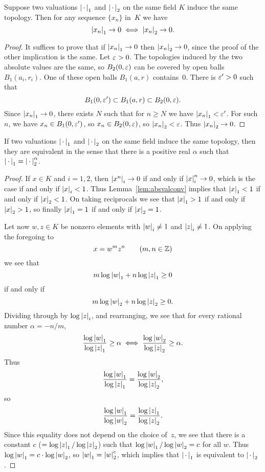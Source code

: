 \begin{lemma}\label{lem:absvalconv}
Suppose two valuations $\left|\,\cdot\,\right|_1$ and $\left|\,\cdot\,\right|_2$ on the same
field $K$ induce the same topology. Then
for any sequence $\{x_n\}$ in~$K$ we
have 
$$
  \left|x_n\right|_1 \to 0 \iff \left|x_n\right|_2 \to 0.
$$
\end{lemma}
\begin{proof}
It suffices to prove that if $\left|x_n\right|_1\to 0$
then $\left|x_n\right|_2\to 0$, since the proof of the
other implication is the same. 
Let $\varepsilon>0$.  The topologies induced by the two absolute
values are the same, so $B_2(0,\varepsilon)$ can be covered by
open balls $B_1(a_i,r_i)$.  One of these open balls
$B_1(a,r)$ contains~$0$. There is $\varepsilon'>0$ such that
$$
  B_1(0,\varepsilon') \subset B_1(a,r)\subset B_2(0,\varepsilon).
$$
Since $\left|x_n\right|_1\to 0$, there exists $N$ such
that for $n\geq N$ we have $\left|x_n\right|_1 <\varepsilon'$.
For such~$n$, we have $x_n\in B_1(0,\varepsilon')$, so $x_n\in B_2(0,\varepsilon)$,
so $\left|x_n\right|_2<\varepsilon$.  Thus $\left|x_n\right|_2\to 0$.
\end{proof}

\begin{proposition}\label{prop:same_topo}
If two valuations $\left|\,\cdot\,\right|_1$ and $\left|\,\cdot\,\right|_2$ on the same
field induce the same topology, then they are equivalent in
the sense that there is a positive real $\alpha$ such that 
$\left|\,\cdot\,\right|_1 = \left|\,\cdot\,\right|_2^{\alpha}$.
\end{proposition}
\begin{proof}
If $x\in K$ and $i=1,2$, then $\left|x^n\right|_i \to 0$
if and only if $\left|x\right|_i^n\to 0$, which is the
case if and only if $\left|x\right|_i<1$.   Thus 
Lemma~\ref{lem:absvalconv} implies that 
$\left|x\right|_1<1$ if and only if $\left|x\right|_2<1$.
On taking reciprocals we see that $\left|x\right|_1>1$
if and only if $\left|x\right|_2>1$, so finally
$\left|x\right|_1 = 1$ if and only if $\left|x\right|_2=1$.

Let now $w,z\in K$ be nonzero elements with $\left|w\right|_i \neq 1$ and
$\left|z\right|_i\neq 1$.  On
applying the foregoing to
$$
  x = w^m z^n \qquad (m,n\in\mathbb{Z})
$$
we see that
$$
  m\log\left|w\right|_1 + n\log\left|z\right|_1 \geq 0
$$
if and only if
$$
  m\log\left|w\right|_2 + n\log\left|z\right|_2 \geq 0.
$$
Dividing through by $\log\left|z\right|_i$, and rearranging,
we see that for every rational number $\alpha=-n/m$, 
$$
  \frac{\log\left|w\right|_1}{\log \left|z\right|_1} \geq \alpha
\iff
  \frac{\log\left|w\right|_2}{\log \left|z\right|_2} \geq \alpha.
$$
Thus 
$$
  \frac{\log\left|w\right|_1}{\log \left|z\right|_1} =  
                \frac{\log\left|w\right|_2}{\log \left|z\right|_2},
$$
so 
$$
  \frac{\log\left|w\right|_1}{\log \left|w\right|_2} =  
                \frac{\log\left|z\right|_1}{\log \left|z\right|_2}.
$$
Since this equality does not depend on the choice of~$z$,
we see that there is a constant $c$ ($=\log\left|z\right|_1/\log \left|z\right|_2$)
such that $\log\left|w\right|_1/\log \left|w\right|_2 = c$ for all $w$.
Thus $\log\left|w\right|_1 = c\cdot \log\left|w\right|_2$, so 
$\left|w\right|_1 = \left|w\right|_2^c$, which implies that $\left|\,\cdot\,\right|_1$
is equivalent to $\left|\,\cdot\,\right|_2$.
\end{proof}


